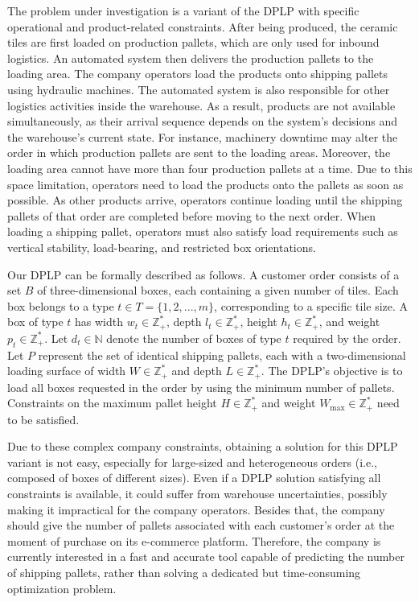 \documentclass[runningheads]{llncs}
\newcommand{\rev}[1]{{#1}}
\begin{document}
The problem under investigation is a variant of the DPLP with specific operational and product-related constraints.
\rev{After being produced, the ceramic tiles are first loaded on production pallets, which are only used for inbound logistics. An automated system then delivers the production pallets to the loading area. The company operators load the products onto shipping pallets using hydraulic machines.} The automated system is also responsible for other logistics activities inside the warehouse. As a result, products are not available simultaneously, as their arrival sequence depends on the system's decisions and the warehouse's current state. For instance, machinery downtime may alter the order in which production pallets are sent to the loading areas. Moreover, the loading area cannot have more than four production pallets at a time. Due to this space limitation, operators need to load the products onto the pallets as soon as possible. As other products arrive, operators continue loading until the shipping pallets of that order are completed before moving to the next order. \rev{When loading a shipping pallet, operators must also satisfy load requirements such as vertical stability, load-bearing, and restricted box orientations.}

Our DPLP can be formally described as follows. A customer order consists of a set \( B \) of three-dimensional boxes, each containing a given number of tiles. Each box belongs to a type \( t \in T = \{1,2,...,m\} \), corresponding to a specific tile size. A box of type \( t \) has width \( w_t \in \mathbb{Z}^{*}_{+} \), depth \( l_t \in \mathbb{Z}^{*}_{+} \), height \( h_t \in \mathbb{Z}^{*}_{+} \), and weight \( p_t \in \mathbb{Z}^{*}_{+} \). 
Let \( d_t \in \mathbb{N}\) denote the number of boxes of type \( t \) required by the order. Let \( P \) represent the set of identical shipping pallets, each with a two-dimensional loading surface of width \(W \in \mathbb{Z}^{*}_{+}\) and depth \( L \in \mathbb{Z}^{*}_{+} \). The DPLP's objective is to load all boxes requested in the order by using the minimum number of pallets. Constraints on the maximum pallet height \( H \in \mathbb{Z}^{*}_{+} \) and weight \(W_{\max} \in \mathbb{Z}^{*}_{+} \) need to be satisfied. 

Due to these complex company constraints, obtaining a solution for this DPLP variant is not easy, especially for large-sized and heterogeneous orders (i.e., composed of boxes of different sizes). \rev{Even if a DPLP solution satisfying all constraints is available, it could suffer from warehouse uncertainties, possibly making it impractical for the company operators.} Besides that, the company should give the number of pallets associated with each customer's order at the moment of purchase on its e-commerce platform. 
Therefore, the company is currently interested in a fast and accurate tool capable of predicting the number of shipping pallets, rather than solving a dedicated but time-consuming optimization problem.
\end{document}

